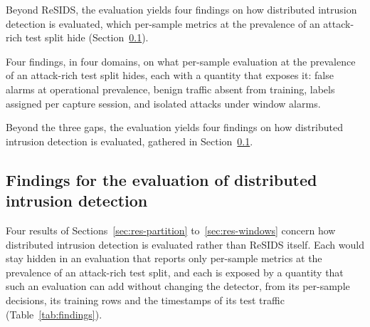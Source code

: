 Beyond ReSIDS, the evaluation yields four findings on how distributed intrusion detection is
evaluated, which per-sample metrics at the prevalence of an attack-rich test split hide
(Section~\ref{sec:res-findings}).

\item Four findings, in four domains, on what per-sample evaluation at the prevalence of an
attack-rich test split hides, each with a quantity that exposes it: false alarms at operational
prevalence, benign traffic absent from training, labels assigned per capture session, and
isolated attacks under window alarms.

Beyond the three gaps, the evaluation yields four findings on how distributed intrusion detection
is evaluated, gathered in Section~\ref{sec:res-findings}.

\subsection{Findings for the evaluation of distributed intrusion detection}
\label{sec:res-findings}
Four results of Sections~\ref{sec:res-partition} to~\ref{sec:res-windows} concern how distributed
intrusion detection is evaluated rather than ReSIDS itself. Each would stay hidden in an
evaluation that reports only per-sample metrics at the prevalence of an attack-rich test split,
and each is exposed by a quantity that such an evaluation can add without changing the detector,
from its per-sample decisions, its training rows and the timestamps of its test traffic
(Table~\ref{tab:findings}).


